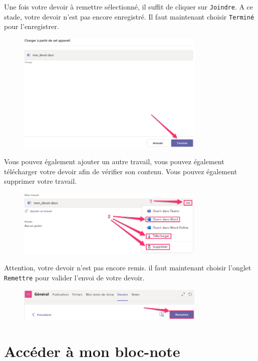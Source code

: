 Une fois votre devoir à remettre sélectionné, il suffit de cliquer sur \texttt{Joindre}. A ce stade, votre devoir n'est pas encore enregistré. Il faut maintenant choisir \texttt{Terminé} pour l'enregistrer.

\begin{figure}[H]
\includegraphics[width=9cm]{./images/teams/ajout2}
\centering
\end{figure}

Vous pouvez également ajouter un autre travail, vous pouvez également télécharger votre devoir afin de vérifier son contenu. Vous pouvez également supprimer votre travail.

\begin{figure}[H]
\includegraphics[width=9cm]{./images/teams/ajout3}
\centering
\end{figure}

Attention, votre devoir n'est pas encore remis. il faut maintenant choisir l'onglet \texttt{Remettre} pour valider l'envoi de votre devoir. 

\begin{figure}[H]
\includegraphics[width=9cm]{./images/teams/ajout4}
\centering
\end{figure}


\section{Accéder à mon bloc-note}

